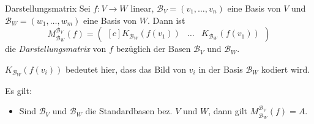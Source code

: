\documentclass[german]{../spicker}
\newcommand{\vektor}[1]{\begin{pmatrix*}[c] #1 \end{pmatrix*}}
\begin{document}
\begin{defi}{Darstellungsmatrix}
    Sei $f : V \to W$ linear, $\mathcal{B}_V = (v_1, \ldots, v_n)$ eine Basis von $V$ und $\mathcal{B}_W = (w_1, \ldots, w_m)$ eine Basis von $W$.
    Dann ist
    $$
        M^{\mathcal{B}_V}_{\mathcal{B}_W} (f) = \vektor{K_{\mathcal{B}_W}(f(v_1)) & \ldots & K_{\mathcal{B}_W}(f(v_1))}
    $$
    die \emph{Darstellungsmatrix} von $f$ bezüglich der Basen $\mathcal{B}_V$ und $\mathcal{B}_W$.

    $K_{\mathcal{B}_W}(f(v_i))$ bedeutet hier, dass das Bild von $v_i$ in der Basis $\mathcal{B}_W$ kodiert wird.

    Es gilt:
    \begin{itemize}
        \item Sind $\mathcal{B}_V$ und $\mathcal{B}_W$ die Standardbasen bez. $V$ und $W$, dann gilt $M^{\mathcal{B}_V}_{\mathcal{B}_W} (f) = A$.
    \end{itemize}
\end{defi}
\end{document}
